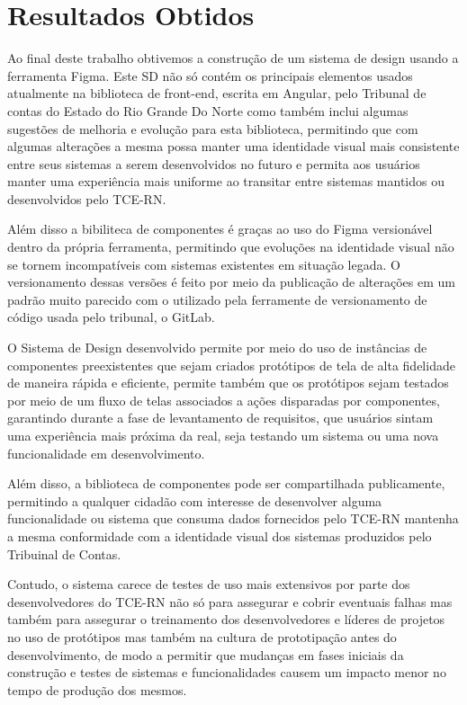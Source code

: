 \chapter[Capítulo 4]{Resultados Obtidos}
\label{ch:cap4}

  Ao final deste trabalho obtivemos a construção de um sistema de design usando a ferramenta Figma. Este SD não só contém os principais elementos usados atualmente na biblioteca de front-end, escrita em Angular, pelo Tribunal de contas do Estado do Rio Grande Do Norte como também inclui algumas sugestões de melhoria e evolução para esta biblioteca, permitindo que com algumas alterações a mesma possa manter uma identidade visual mais consistente entre seus sistemas a serem desenvolvidos no futuro e permita aos usuários manter uma experiência mais uniforme ao transitar entre sistemas mantidos ou desenvolvidos pelo TCE-RN.
  
  Além disso a bibiliteca de componentes é graças ao uso do Figma versionável dentro da própria ferramenta, permitindo que evoluções na identidade visual não se tornem incompatíveis com sistemas existentes em situação legada. O versionamento dessas versões é feito por meio da publicação de alterações em um padrão muito parecido com o utilizado pela ferramente de versionamento de código usada pelo tribunal, o GitLab.

  O Sistema de Design desenvolvido permite por meio do uso de instâncias de componentes preexistentes que sejam criados protótipos de tela de alta fidelidade de maneira rápida e eficiente, permite também que os protótipos sejam testados por meio de um fluxo de telas associados a ações disparadas por componentes, garantindo durante a fase de levantamento de requisitos, que usuários sintam uma experiência mais próxima da real, seja testando um sistema ou uma nova funcionalidade em desenvolvimento.

  Além disso, a biblioteca de componentes pode ser compartilhada publicamente, permitindo a qualquer cidadão com interesse de desenvolver alguma funcionalidade ou sistema que consuma dados fornecidos pelo TCE-RN mantenha a mesma conformidade com a identidade visual dos sistemas produzidos pelo Tribuinal de Contas.

  Contudo, o sistema carece de testes de uso mais extensivos por parte dos desenvolvedores do TCE-RN não só para assegurar e cobrir eventuais falhas mas também para assegurar o treinamento dos desenvolvedores e líderes de projetos no uso de protótipos mas também na cultura de prototipação antes do desenvolvimento, de modo a permitir que mudanças em fases iniciais da construção e testes de sistemas e funcionalidades causem um impacto menor no tempo de produção dos mesmos.

